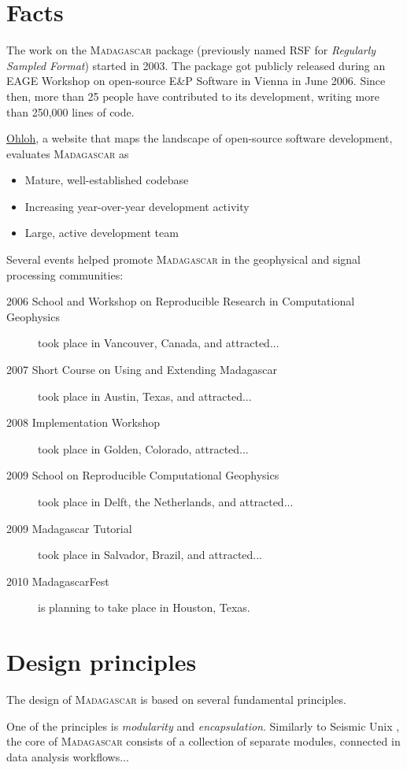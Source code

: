 \section{Facts}

The work on the \textsc{Madagascar} package (previously named RSF for
\emph{Regularly Sampled Format}) started in 2003.  The package got
publicly released during an EAGE Workshop on open-source E\&P Software
in Vienna in June 2006. Since then, more than 25 people have
contributed to its development, writing more than 250,000 lines of
code.

\href{http://www.ohloh.net/}{Ohloh}, a website that maps the landscape
of open-source software development, evaluates \textsc{Madagascar} as
\begin{itemize}
\item Mature, well-established codebase
\item Increasing year-over-year development activity
\item Large, active development team 
\end{itemize}

Several events helped promote \textsc{Madagascar} in the geophysical
and signal processing communities:
\begin{description}
\item[2006 School and Workshop on Reproducible Research in
  Computational Geophysics] took place in Vancouver, Canada, and
  attracted...
\item[2007 Short Course on Using and Extending Madagascar] took place
  in Austin, Texas, and attracted...
\item[2008 Implementation Workshop] took place in Golden, Colorado, attracted...
\item[2009 School on Reproducible Computational Geophysics] took place
  in Delft, the Netherlands, and attracted...
\item[2009 Madagascar Tutorial] took place in Salvador, Brazil, and attracted...
\item[2010 MadagascarFest] is planning to take place in Houston, Texas.
\end{description}

\section{Design principles}

The design of \textsc{Madagascar} is based on several fundamental
principles. 

One of the principles is \emph{modularity} and
\emph{encapsulation}. Similarly to Seismic Unix \cite[]{TLE16-07-10451049},
the core of \textsc{Madagascar} consists of a collection of separate
modules, connected in data analysis workflows...


